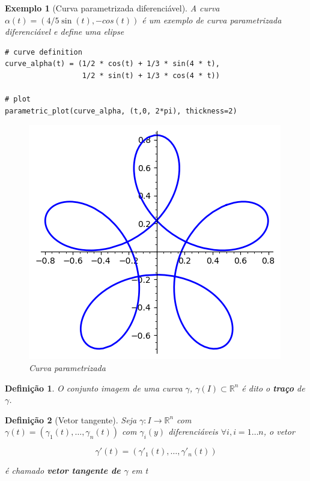 \documentclass[12pt]{article}
\newtheorem{ex}{Exemplo}[section]
\newtheorem{definition}{Definição}
\begin{document}
\begin{ex}[Curva parametrizada diferenciável] A curva $\alpha(t) = (4/5 \sin(t), - cos(t))$ é um exemplo de curva parametrizada diferenciável e define uma elipse
\begin{lstlisting}
# curve definition
curve_alpha(t) = (1/2 * cos(t) + 1/3 * sin(4 * t), 
                  1/2 * sin(t) + 1/3 * cos(4 * t))

# plot
parametric_plot(curve_alpha, (t,0, 2*pi), thickness=2)
\end{lstlisting}

\begin{figure}[H]
    \centering
    \includegraphics[scale=.6]{Images/ex1.1.png}
    \caption{Curva parametrizada}
    \label{fig:ex1.1}
\end{figure}
\end{ex}

\begin{definition}
O conjunto imagem de uma curva $\gamma$, $\gamma(I) \subset \mathbb{R}^n$ é dito o \textbf{traço} de $\gamma$.
\end{definition}

\begin{definition}[Vetor tangente]
Seja $\gamma: I \rightarrow \mathbb{R}^n$ com $\gamma(t) = (\gamma_1 (t), \ldots, \gamma_n (t))$ com $\gamma_i (y)$ diferenciáveis $\forall i, i = 1 \ldots n$, o vetor

$$\gamma'(t) = (\gamma'_1 (t), \ldots, \gamma'_n (t))$$

é chamado \textbf{vetor tangente de $\gamma$} em t
\end{definition}
\end{document}
